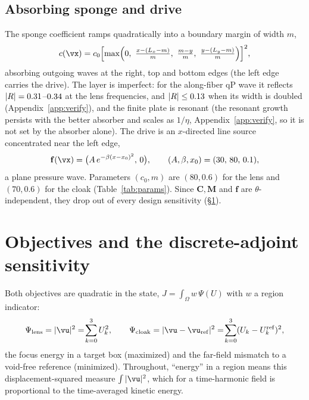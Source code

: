 \subsection{Absorbing sponge and drive}
\label{sec:sponge}
The sponge coefficient ramps quadratically into a boundary margin of width $m$,
\begin{equation}
  c(\vx)=c_0\Bigl[\max\Bigl(0,\ \tfrac{x-(L_x-m)}{m},\ \tfrac{m-y}{m},\
  \tfrac{y-(L_y-m)}{m}\Bigr)\Bigr]^2 ,
  \label{eq:sponge}
\end{equation}
absorbing outgoing waves at the right, top and bottom edges (the left edge carries the
drive). The layer is imperfect: for the along-fiber qP wave it reflects
$|R|=0.31$--$0.34$ at the lens frequencies, and $|R|\le0.13$ when its width
is doubled (Appendix~\ref{app:verify}), and the finite plate is resonant (the resonant growth persists with the better absorber and scales as $1/\eta$, Appendix~\ref{app:verify}, so it is not set by the absorber alone). The drive is an $x$-directed line source
concentrated near the left edge,
\begin{equation}
  \mathbf f(\vx)=\bigl(A\,e^{-\beta (x-x_0)^2},\,0\bigr),\qquad
  (A,\beta,x_0)=(30,\,80,\,0.1),
  \label{eq:source}
\end{equation}
a plane pressure wave. Parameters $(c_0,m)$ are $(80,0.6)$ for the lens and
$(70,0.6)$ for the cloak (Table~\ref{tab:params}). Since $\mathbf C,\mathbf M$
and $\mathbf f$ are $\theta$-independent, they drop out of every design
sensitivity (\S\ref{sec:adj}).

\section{Objectives and the discrete-adjoint sensitivity}
\label{sec:adj}
Both objectives are quadratic in the state, $J=\int_\Omega w\,\Psi(U)$ with $w$ a
region indicator:
\begin{equation}
  \Psi_{\rm lens}=|\vu|^2=\!\sum_{k=0}^{3}U_k^2,\qquad
  \Psi_{\rm cloak}=|\vu-\vu_{\rm ref}|^2=\!\sum_{k=0}^{3}(U_k-U_k^{\rm ref})^2,
\end{equation}
the focus energy in a target box (maximized) and the far-field mismatch to a
void-free reference (minimized). Throughout, ``energy'' in a region means this
displacement-squared measure $\int|\vu|^2$, which for a time-harmonic field is proportional to the
time-averaged kinetic energy.

